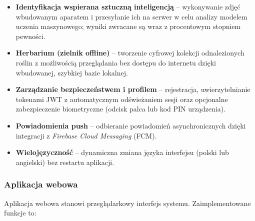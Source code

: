 \documentclass[12pt,a4paper]{article}
\begin{document}
\begin{itemize}[label=\textbullet, leftmargin=1.5cm]
    \item \textbf{Identyfikacja wspierana sztuczn\k{a} inteligencj\k{a}} -- wykonywanie zdj\k{e}\'c wbudowanym aparatem i przesy\l{}anie ich na serwer w celu analizy modelem uczenia maszynowego; wyniki zwracane s\k{a} wraz z procentowym stopniem pewno\'sci.
    \item \textbf{Herbarium (zielnik offline)} -- tworzenie cyfrowej kolekcji odnalezionych ro\'slin z mo\.zliwo\'sci\k{a} przegl\k{a}dania bez dost\k{e}pu do internetu dzi\k{e}ki wbudowanej, szybkiej bazie lokalnej.
    \item \textbf{Zarz\k{a}dzanie bezpiecze\'nstwem i profilem} -- rejestracja, uwierzytelnianie tokenami JWT z automatycznym od\'swie\.zaniem sesji oraz opcjonalne zabezpieczenie biometryczne (odcisk palca lub kod PIN urz\k{a}dzenia).
    \item \textbf{Powiadomienia push} -- odbieranie powiadomie\'n asynchronicznych dzi\k{e}ki integracji z \textit{Firebase Cloud Messaging} (FCM).
    \item \textbf{Wieloj\k{e}zyczno\'s\'c} -- dynamiczna zmiana j\k{e}zyka interfejsu (polski lub angielski) bez restartu aplikacji.
\end{itemize}

\subsubsection{Aplikacja webowa}

Aplikacja webowa stanowi przegl\k{a}darkowy interfejs systemu. Zaimplementowane funkcje to:
\end{document}
